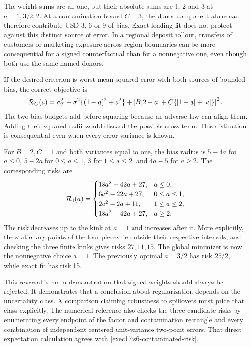 The weight sums are all one, but their absolute sums are 1, 2 and 3
at $a=1,3/2,2$. At a contamination bound $C=3$, the donor component
alone can therefore contribute USD 3, 6 or 9 of bias. Exact loading fit
does not protect against this distinct source of error. In a regional
deposit rollout, transfers of customers or marketing exposure across region
boundaries can be more consequential for a signed counterfactual than for
a nonnegative one, even though both use the same named donors.

If the desired criterion is worst mean squared error with both sources of
bounded bias, the correct objective is
\begin{equation}
 {\cal R}_C(a)=\sigma_T^2+\sigma^2\{(1-a)^2+a^2\}
       +\left[B|2-a|+C\{|1-a|+|a|\}\right]^2.
 \label{exec17:s6-contaminated-risk}
\end{equation}
The two bias budgets add before squaring because an adverse law can align
them. Adding their squared radii would discard the possible cross term.
This distinction is consequential even when every error variance is known.

For $B=2,C=1$ and both variances equal to one, the bias radius is
$5-4a$ for $a\leq0$, $5-2a$ for $0\leq a\leq1$, 3 for
$1\leq a\leq2$, and $4a-5$ for $a\geq2$. The corresponding risks are
\begin{equation}
 {\cal R}_1(a)=
 \begin{cases}
 18a^2-42a+27,&a\leq0,\\
 6a^2-22a+27,&0\leq a\leq1,\\
 2a^2-2a+11,&1\leq a\leq2,\\
 18a^2-42a+27,&a\geq2.
 \end{cases}
 \label{exec17:s6-contaminated-pieces}
\end{equation}
The risk decreases up to the kink at $a=1$ and increases after it.
More explicitly, the stationary points of the four pieces lie outside
their respective intervals, and checking the three finite kinks gives
risks $27,11,15$. The global minimizer is now the nonnegative choice
$a=1$. The previously optimal $a=3/2$ has risk $25/2$, while
exact fit has risk 15.

This reversal is not a demonstration that signed weights should always be
rejected. It demonstrates that a conclusion about regularization depends
on the uncertainty class. A comparison claiming robustness to spillovers
must price that class explicitly. The numerical reference also checks the
three candidate risks by enumerating every endpoint of the factor and
contamination rectangle and every combination of independent centered
unit-variance two-point errors. That direct expectation calculation agrees
with \eqref{exec17:s6-contaminated-risk}.\citep{exec17_s6_math}

